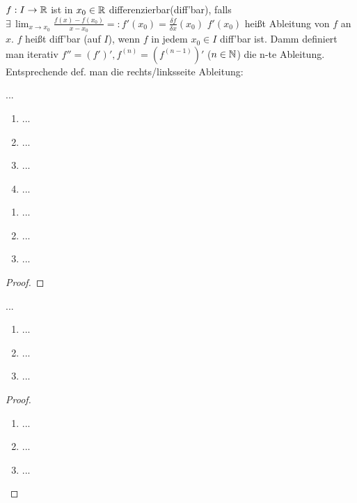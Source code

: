 \documentclass[12pt]{scrreprt}
\begin{document}
\begin{dfn}\label{dfn:diff.rechenregeln.diffbar} $f: I \rightarrow \mathbb{R}$ ist in $x_0 \in \mathbb{R}$ differenzierbar(diff'bar), falls
$\exists\,\lim_{x\to x_0} \frac{f(x) - f(x_0)}{x-x_0} =: f'(x_0) = \frac{\delta f}{\delta x}(x_0)$ %
$f'(x_0)$ heißt Ableitung von $f$ an $x$. $f$ heißt diff'bar (auf $I$), wenn $f$ in jedem $x_0 \in I$ diff'bar ist. Damm definiert man
iterativ $f'' = (f')', f^(n) = (f^(n-1))'$ ($n \in \mathbb{N}$) die n-te Ableitung.
Entsprechende def. man die rechts/linksseite Ableitung:

\end{dfn}

\begin{bem*}
...
\begin{enumerate}
\item ...
\item ...
\item ...
\item ...
\end{enumerate}
\end{bem*}

\begin{bsp}\label{}
\begin{enumerate}
\item ...
\item ...
\item ...
\end{enumerate}
\end{bsp}

\begin{satz}\label{}

\end{satz}
\begin{proof}

\end{proof}

\begin{satz}\label{}
...
\begin{enumerate}
\item ...
\item ...
\item ...
\end{enumerate}
\end{satz}
\begin{proof}
\begin{enumerate}
\item ...
\item ...
\item ...
\end{enumerate}
\end{proof}
\end{document}
